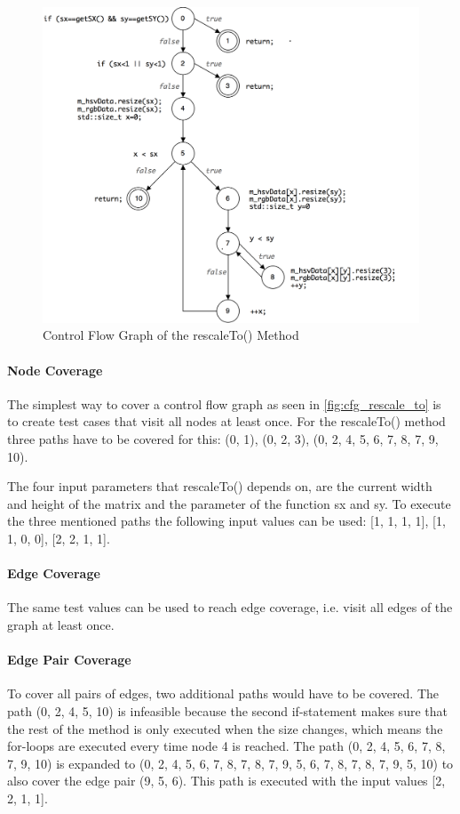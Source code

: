 \documentclass{scrreprt}
\begin{document}
\begin{figure}[h]
	\centering
	\includegraphics[width=1.0\textwidth]{img/cfg_rescale_to}
	\caption[Control Flow Graph rescaleTo()]{Control Flow Graph of the rescaleTo() Method}
	\label{fig:cfg_rescale_to}
\end{figure}

\paragraph{Node Coverage} The simplest way to cover a control flow graph as seen in \vref{fig:cfg_rescale_to} is to create test cases that visit all nodes at least once. For the rescaleTo() method three paths have to be covered for this: (0, 1), (0, 2, 3), (0, 2, 4, 5, 6, 7, 8, 7, 9, 10).

The four input parameters that rescaleTo() depends on, are the current width and height of the matrix and the parameter of the function sx and sy. To execute the three mentioned paths the following input values can be used: [1, 1, 1, 1], [1, 1, 0, 0], [2, 2, 1, 1].

\paragraph{Edge Coverage} The same test values can be used to reach edge coverage, i.e. visit all edges of the graph at least once.

\paragraph{Edge Pair Coverage} To cover all pairs of edges, two additional paths would have to be covered. The path (0, 2, 4, 5, 10) is infeasible because the second if-statement makes sure that the rest of the method is only executed when the size changes, which means the for-loops are executed every time node 4 is reached.
The path (0, 2, 4, 5, 6, 7, 8, 7, 9, 10) is expanded to (0, 2, 4, 5, 6, 7, 8, 7, 8, 7, 9, 5, 6, 7, 8, 7, 8, 7, 9, 5, 10) to also cover the edge pair (9, 5, 6). This path is executed with the input values [2, 2, 1, 1].
\end{document}
